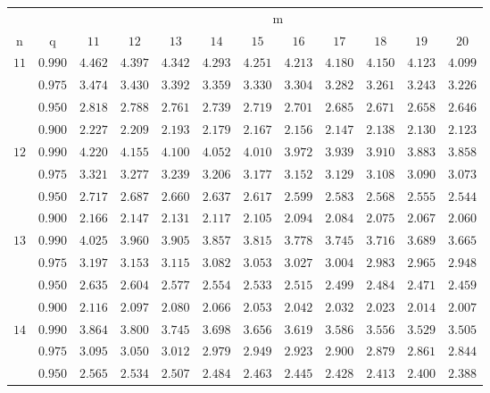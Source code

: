 \documentclass[11pt]{article}
\theoremstyle{definition}
\begin{document}
\begin{table}[H]
	\begin{tabularx}{\linewidth}{c | c | c c c c c c c c c c}
		& & \multicolumn{10}{c}{m}\\
		\cline{3-12}
		n & q & $11$ & $12$ & $13$ & $14$ & $15$ & $16$ & $17$ & $18$ & $19$ & $20$\\
		\hline
		$11$ & $0.990$ & $4.462$ & $4.397$ & $4.342$ & $4.293$ & $4.251$ & $4.213$ & $4.180$ & $4.150$ & $4.123$ & $4.099$ \\
		& $0.975$ & $3.474$ & $3.430$ & $3.392$ & $3.359$ & $3.330$ & $3.304$ & $3.282$ & $3.261$ & $3.243$ & $3.226$ \\
		& $0.950$ & $2.818$ & $2.788$ & $2.761$ & $2.739$ & $2.719$ & $2.701$ & $2.685$ & $2.671$ & $2.658$ & $2.646$ \\
		& $0.900$ & $2.227$ & $2.209$ & $2.193$ & $2.179$ & $2.167$ & $2.156$ & $2.147$ & $2.138$ & $2.130$ & $2.123$ \\
		$12$ & $0.990$ & $4.220$ & $4.155$ & $4.100$ & $4.052$ & $4.010$ & $3.972$ & $3.939$ & $3.910$ & $3.883$ & $3.858$ \\
		& $0.975$ & $3.321$ & $3.277$ & $3.239$ & $3.206$ & $3.177$ & $3.152$ & $3.129$ & $3.108$ & $3.090$ & $3.073$ \\
		& $0.950$ & $2.717$ & $2.687$ & $2.660$ & $2.637$ & $2.617$ & $2.599$ & $2.583$ & $2.568$ & $2.555$ & $2.544$ \\
		& $0.900$ & $2.166$ & $2.147$ & $2.131$ & $2.117$ & $2.105$ & $2.094$ & $2.084$ & $2.075$ & $2.067$ & $2.060$ \\
		$13$ & $0.990$ & $4.025$ & $3.960$ & $3.905$ & $3.857$ & $3.815$ & $3.778$ & $3.745$ & $3.716$ & $3.689$ & $3.665$ \\
		& $0.975$ & $3.197$ & $3.153$ & $3.115$ & $3.082$ & $3.053$ & $3.027$ & $3.004$ & $2.983$ & $2.965$ & $2.948$ \\
		& $0.950$ & $2.635$ & $2.604$ & $2.577$ & $2.554$ & $2.533$ & $2.515$ & $2.499$ & $2.484$ & $2.471$ & $2.459$ \\
		& $0.900$ & $2.116$ & $2.097$ & $2.080$ & $2.066$ & $2.053$ & $2.042$ & $2.032$ & $2.023$ & $2.014$ & $2.007$ \\
		$14$ & $0.990$ & $3.864$ & $3.800$ & $3.745$ & $3.698$ & $3.656$ & $3.619$ & $3.586$ & $3.556$ & $3.529$ & $3.505$ \\
		& $0.975$ & $3.095$ & $3.050$ & $3.012$ & $2.979$ & $2.949$ & $2.923$ & $2.900$ & $2.879$ & $2.861$ & $2.844$ \\
		& $0.950$ & $2.565$ & $2.534$ & $2.507$ & $2.484$ & $2.463$ & $2.445$ & $2.428$ & $2.413$ & $2.400$ & $2.388$ \\

\end{tabularx}
\end{table}
\end{document}
